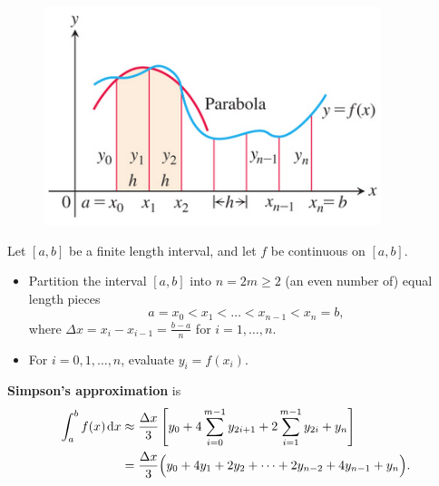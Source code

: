 \begin{figure}[H]
\includegraphics[height=2.5in]{img/simpson_rule}
\end{figure}

\begin{definition}
Let $[a,b]$ be a finite length interval, and let $f$ be continuous on $[a,b]$.
\begin{itemize}
\item Partition the interval $[a,b]$ into $n=2m \ge 2$ (an even number of) equal length pieces
\begin{equation*}
a=x_0 < x_1 <\dots < x_{n-1} < x_n = b,
\end{equation*}
where $\Delta x = x_i - x_{i-1} = \frac{b-a}{n}$ for $i=1,\dots, n$.
\item For $i=0,1,\dots, n$, evaluate $y_i = f(x_i)$.
\end{itemize}
\textbf{Simpson's approximation} is
\begin{equation*}
\begin{split}
\int_a^bf(x)\mkern 2mu \mathrm{d} x &\approx \frac{\Delta x}{3}\left[y_0 + 4\sum_{i=0}^{m-1} y_{2i+1} + 2\sum_{i=1}^{m-1} y_{2i} + y_n\right]\\
&= \frac{\Delta x}{3}\Big(y_0 + 4y_1 + 2y_2 + \dots + 2y_{n-2} + 4y_{n-1} + y_n\Big).
\end{split}
\end{equation*}
\end{definition}

\newpage


